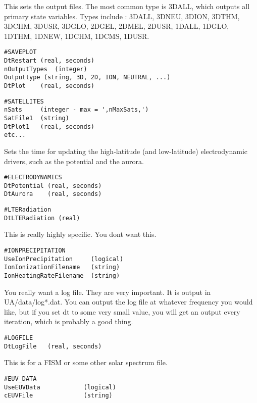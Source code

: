 This sets the output files.  The most common type
is 3DALL, which outputs all primary state variables.
Types include : 3DALL, 3DNEU, 3DION, 3DTHM, 3DCHM, 
3DUSR, 3DGLO, 2DGEL, 2DMEL, 2DUSR, 1DALL, 1DGLO, 
1DTHM, 1DNEW, 1DCHM, 1DCMS, 1DUSR.
\begin{verbatim}
#SAVEPLOT
DtRestart (real, seconds)
nOutputTypes  (integer)
Outputtype (string, 3D, 2D, ION, NEUTRAL, ...)
DtPlot    (real, seconds)
\end{verbatim}

\begin{verbatim}
#SATELLITES
nSats     (integer - max = ',nMaxSats,')
SatFile1  (string)
DtPlot1   (real, seconds)
etc...
\end{verbatim}

Sets the time for updating the high-latitude
(and low-latitude) electrodynamic drivers, such as
the potential and the aurora.
\begin{verbatim}
#ELECTRODYNAMICS
DtPotential (real, seconds)
DtAurora    (real, seconds)
\end{verbatim}

\begin{verbatim}
#LTERadiation
DtLTERadiation (real)
\end{verbatim}

This is really highly specific.  You dont want this.
\begin{verbatim}
#IONPRECIPITATION
UseIonPrecipitation     (logical)
IonIonizationFilename   (string)
IonHeatingRateFilename  (string)
\end{verbatim}

You really want a log file.  They are very important.
It is output in UA/data/log*.dat.
You can output the log file at whatever frequency
you would like, but if you set dt to some very small
value, you will get an output every iteration, which
is probably a good thing.
\begin{verbatim}
#LOGFILE
DtLogFile   (real, seconds)
\end{verbatim}

This is for a FISM or some other solar spectrum file.
\begin{verbatim}
#EUV_DATA
UseEUVData            (logical)
cEUVFile              (string)
\end{verbatim}

